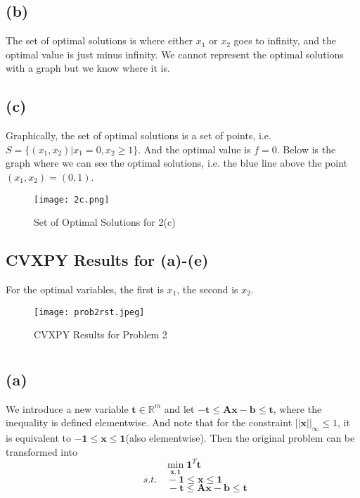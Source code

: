 \documentclass[12pt,letterpaper]{article}
\begin{document}
\subsection*{(b)}
The set of optimal solutions is where either $x_1$ or $x_2$ goes to infinity, and the optimal value is just minus infinity. We cannot represent the optimal solutions with a graph but we know where it is.
\subsection*{(c)}
Graphically, the set of optimal solutions is a set of points, i.e. $S=\{(x_1,x_2)|x_1=0,x_2\geq1\}$. And the optimal value is $f=0$. Below is the graph where we can see the optimal solutions, i.e. the blue line above the point $(x_1,x_2)=(0,1)$.
\begin{figure}[htbp]
    \centering
    \texttt{[image: 2c.png]}
    \caption{\label{fig:2c} Set of Optimal Solutions for 2(c)}
\end{figure}
\subsection*{CVXPY Results for (a)-(e)}
For the optimal variables, the first is $x_1$, the second is $x_2$.
\begin{figure}[htbp]
    \centering
    \texttt{[image: prob2rst.jpeg]}
    \caption{\label{fig:cvxpy} CVXPY Results for Problem 2}
\end{figure}

\section{}
\subsection*{(a)}
We introduce a new variable $\boldsymbol{t}\in\mathbb{R}^m$ and let $-\boldsymbol{t}\leq\boldsymbol{Ax}-\boldsymbol{b}\leq\boldsymbol{t}$, where the inequality is defined elementwise. And note that for the constraint $||\boldsymbol{x}||_{\infty}\leq1$, it is equivalent to $-\boldsymbol{1}\leq\boldsymbol{x}\leq\boldsymbol{1}$(also elementwise). Then the original problem can be transformed into
$$\min_{\boldsymbol{x},\boldsymbol{t}}\boldsymbol{1}^T\boldsymbol{t}$$
$$s.t.\quad  -\boldsymbol{1}\leq\boldsymbol{x}\leq\boldsymbol{1}$$
$$\qquad \qquad\quad-\boldsymbol{t}\leq\boldsymbol{Ax}-\boldsymbol{b}\leq\boldsymbol{t}$$
\end{document}
